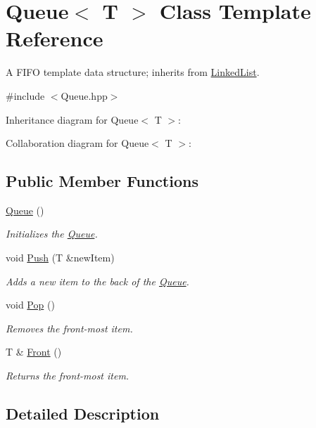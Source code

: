 \hypertarget{classQueue}{}\section{Queue$<$ T $>$ Class Template Reference}
\label{classQueue}


A F\+I\+FO template data structure; inherits from \hyperlink{classLinkedList}{Linked\+List}.  




{\ttfamily \#include $<$Queue.\+hpp$>$}



Inheritance diagram for Queue$<$ T $>$\+:


Collaboration diagram for Queue$<$ T $>$\+:
\subsection*{Public Member Functions}
\begin{DoxyCompactItemize}
\item 
\hyperlink{classQueue_af73bb29c868f7b37f369c668f114bd9f}{Queue} ()
\begin{DoxyCompactList}\small\item\em Initializes the \hyperlink{classQueue}{Queue}. \end{DoxyCompactList}\item 
void \hyperlink{classQueue_a2ff135bcbd0fa0b4c4ac8d23f6ac18f1}{Push} (T \&new\+Item)
\begin{DoxyCompactList}\small\item\em Adds a new item to the back of the \hyperlink{classQueue}{Queue}. \end{DoxyCompactList}\item 
void \hyperlink{classQueue_a8b6295aa2df009fddade5d0915690e89}{Pop} ()
\begin{DoxyCompactList}\small\item\em Removes the front-\/most item. \end{DoxyCompactList}\item 
T \& \hyperlink{classQueue_a16700d9113d5eaef28a25baa0e3329c4}{Front} ()
\begin{DoxyCompactList}\small\item\em Returns the front-\/most item. \end{DoxyCompactList}\end{DoxyCompactItemize}


\subsection{Detailed Description}
